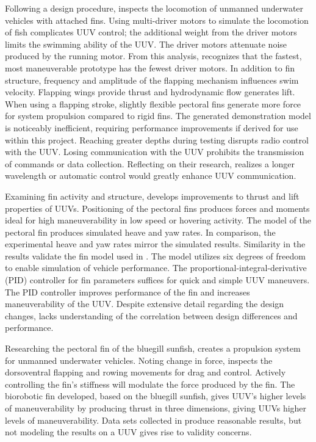 \documentclass{IEEEtran}
\begin{document}
Following a design procedure, \cite{xu2007initial} inspects the locomotion of unmanned underwater vehicles with attached fins.  Using multi-driver motors to simulate the locomotion of fish complicates UUV control; the additional weight from the driver motors limits the swimming ability of the UUV.  The driver motors attenuate noise produced by the running motor.  From this analysis, \cite{xu2007initial} recognizes that the fastest, most maneuverable prototype has the fewest driver motors.  In addition to fin structure, frequency and amplitude of the flapping mechanism influences swim velocity.  Flapping wings provide thrust and hydrodynamic flow generates lift.  When using a flapping stroke, slightly flexible pectoral fins generate more force for system propulsion compared to rigid fins.  The generated demonstration model is noticeably inefficient, requiring performance improvements if derived for use within this project.  Reaching greater depths during testing disrupts radio control with the UUV.  Losing communication with the UUV prohibits the transmission of commands or data collection.  Reflecting on their research, \cite{xu2007initial} realizes a longer wavelength or automatic control would greatly enhance UUV communication.  

Examining fin activity and structure, \cite{geder2013maneuvering} develops improvements to thrust and lift properties of UUVs.  Positioning of the pectoral fins produces forces and moments ideal for high maneuverability in low speed or hovering activity.  The model of the pectoral fin produces simulated heave and yaw rates.  In comparison, the experimental heave and yaw rates mirror the simulated results.  Similarity in the results validate the fin model used in \cite{geder2013maneuvering}.  The model utilizes six degrees of freedom to enable simulation of vehicle performance.  The proportional-integral-derivative (PID) controller for fin parameters suffices for quick and simple UUV maneuvers.  The PID controller improves performance of the fin and increases maneuverability of the UUV.  Despite extensive detail regarding the design changes, \cite{geder2013maneuvering} lacks understanding of the correlation between design differences and performance.  

Researching the pectoral fin of the bluegill sunfish, \cite{tangorra2006biorobotic} creates a propulsion system for unmanned underwater vehicles.  Noting change in force, \cite{tangorra2006biorobotic} inspects the dorsoventral flapping and rowing movements for drag and control.  Actively controlling the fin’s stiffness will modulate the force produced by the fin.  The biorobotic fin developed, based on the bluegill sunfish, gives UUV’s higher levels of maneuverability by producing thrust in three dimensions, giving UUVs higher levels of maneuverability. Data sets collected in \cite{tangorra2006biorobotic} produce reasonable results, but not modeling the results on a UUV gives rise to validity concerns.  
\end{document}
